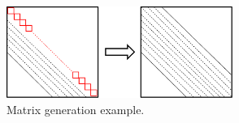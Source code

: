 \documentclass[a4paper, 10 pt]{report}
\begin{document}
	\begin{figure}[htbp]
		\centering
		\includegraphics[width=2.9in]{img/non-Sym.pdf}
		\caption{Matrix generation example.}
		\label{fig:nilo}
	\end{figure}

	\newpage
	
	
	
	
\end{document}
